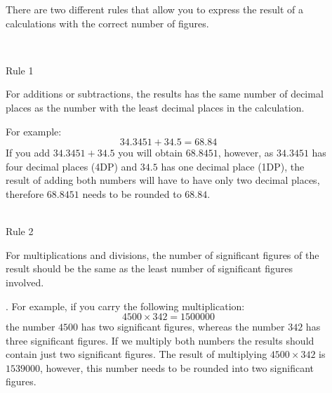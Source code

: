 \documentclass[main.tex]{subfiles}
\begin{document}
\begin{description}
\item[] There are two different rules that allow you to express the result of a calculations with the correct number of figures.

 \faCodeFork\ \begin{bf}Rule 1\end{bf}  \begin{it} For additions or subtractions, the results has the same number of decimal places as the number with the least decimal places in the calculation.\end{it} For example:\\
  \begin{equation*}
34.3451+34.5=68.84
\end{equation*}
If you add $34.3451+34.5$ you will obtain $68.8451$, however, as $34.3451$ has four decimal places (4DP) and $34.5$ has one decimal place (1DP), the result of adding both numbers will have to have only two decimal places, therefore $68.8451$ needs to be rounded to $68.84$.\\
 \faCodeFork\ \begin{bf}Rule 2\end{bf}  \begin{it} For multiplications and divisions, the number of significant figures of the result should be the same as the least number of significant figures involved.\end{it}. For example, if you carry the following multiplication:
\begin{equation*}
4500 \times 342 =1500000
\end{equation*}
the number $4500$ has two significant figures, whereas the number $342$ has three significant figures. If we multiply both numbers the results should contain just two significant figures. The result of multiplying $4500 \times 342$ is $1539000$, however, this number needs to be rounded into two significant figures.



\end{description}
\end{document}
